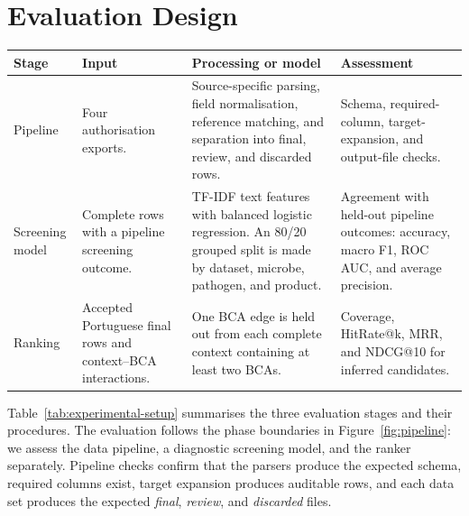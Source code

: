 \section{Evaluation Design}\label{sec:evaluation-design}

\begin{strip}
    \centering
    \label{tab:experimental-setup}
    \scriptsize
    \setlength{\tabcolsep}{3pt}
    \renewcommand{\arraystretch}{1.15}
    \begin{tabular}{p{} p{} p{} p{}}
        \hline
        \textbf{Stage} & \textbf{Input}                                                                     & \textbf{Processing or model}                                                                                                          & \textbf{Assessment}                                                                                             \\
        \hline
        Pipeline       & Four authorisation exports.                                                        & Source-specific parsing, field normalisation, reference matching, and separation into final, review, and discarded rows.              & Schema, required-column, target-expansion, and output-file checks.                                             \\
        Screening model & Complete rows with a pipeline screening outcome.                                  & TF-IDF text features with balanced logistic regression. An 80/20 grouped split is made by dataset, microbe, pathogen, and product. & Agreement with held-out pipeline outcomes: accuracy, macro F1, ROC AUC, and average precision.                  \\
        Ranking        & Accepted Portuguese final rows and context--BCA interactions.                     & One BCA edge is held out from each complete context containing at least two BCAs.                                                        & Coverage, HitRate@k, MRR, and NDCG@10 for inferred candidates.                                                  \\
        \hline
    \end{tabular}
\end{strip}

Table~\ref{tab:experimental-setup} summarises the three evaluation stages and their procedures.
The evaluation follows the phase boundaries in Figure~\ref{fig:pipeline}: we assess the data pipeline, a diagnostic screening model, and the ranker separately.
Pipeline checks confirm that the parsers produce the expected schema, required columns exist, target expansion produces auditable rows, and each data set produces the expected \textit{final}, \textit{review}, and \textit{discarded} files.

